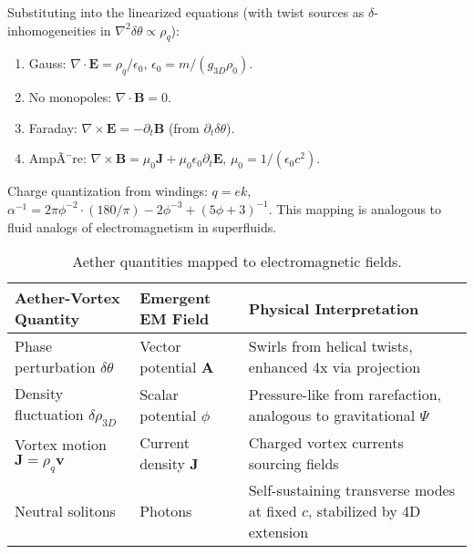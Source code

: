 Substituting into the linearized equations (with twist sources as $\delta$-inhomogeneities in $\nabla^2 \delta \theta \propto \rho_q$):

\begin{enumerate}
\item Gauss: $\nabla \cdot \mathbf{E} = \rho_q / \epsilon_0$, $\epsilon_0 = m / (g_{3D} \rho_0)$.
\item No monopoles: $\nabla \cdot \mathbf{B} = 0$.
\item Faraday: $\nabla \times \mathbf{E} = -\partial_t \mathbf{B}$ (from $\partial_t \delta \theta$).
\item AmpÃ¨re: $\nabla \times \mathbf{B} = \mu_0 \mathbf{J} + \mu_0 \epsilon_0 \partial_t \mathbf{E}$, $\mu_0 = 1 / ( \epsilon_0 c^2 )$.
\end{enumerate}

Charge quantization from windings: $q = e k$, $\alpha^{-1} = 2\pi \phi^{-2} \cdot (180/\pi) - 2 \phi^{-3} + (5 \phi + 3)^{-1}$. This mapping is analogous to fluid analogs of electromagnetism in superfluids.

\begin{table}[h]
\centering
\begin{tabular}{|l|l|l|}
\hline
Aether-Vortex Quantity & Emergent EM Field & Physical Interpretation \\
\hline
Phase perturbation $\delta \theta$ & Vector potential $\mathbf{A}$ & Swirls from helical twists, enhanced 4x via projection \\
Density fluctuation $\delta \rho_{3D}$ & Scalar potential $\phi$ & Pressure-like from rarefaction, analogous to gravitational $\Psi$ \\
Vortex motion $\mathbf{J} = \rho_q \mathbf{v}$ & Current density $\mathbf{J}$ & Charged vortex currents sourcing fields \\
Neutral solitons & Photons & Self-sustaining transverse modes at fixed $c$, stabilized by 4D extension \\
\hline
\end{tabular}
\caption{Aether quantities mapped to electromagnetic fields.}
\label{tab:em_mapping}
\end{table}

\medskip
\noindent
{}
\medskip

